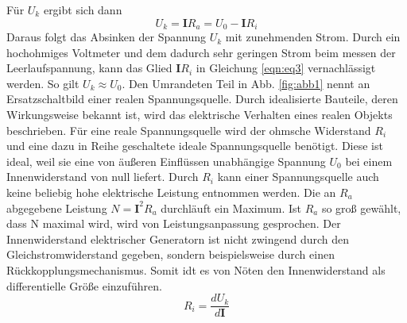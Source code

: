 Für $U_k$ ergibt sich dann
\begin{equation}
  U_k = \symbf{I} R_a = U_0 - \symbf{I} R_i
  \label{eqn:eq3}
\end{equation}
Daraus folgt das Absinken der Spannung $U_k$ mit zunehmenden Strom.
Durch ein hochohmiges Voltmeter und dem dadurch sehr geringen Strom beim messen der Leerlaufspannung, kann das Glied $\symbf{I} R_i$ in Gleichung \ref{eqn:eq3} vernachlässigt werden.
So gilt $U_k \approx U_0$.
Den Umrandeten Teil in Abb. \ref{fig:abb1} nennt an Ersatzschaltbild einer realen Spannungsquelle.
Durch idealisierte Bauteile, deren Wirkungsweise bekannt ist, wird das elektrische Verhalten eines realen Objekts beschrieben.
Für eine reale Spannungsquelle wird der ohmsche Widerstand $R_i$ und eine dazu in Reihe geschaltete ideale Spannungsquelle benötigt.
Diese ist ideal, weil sie eine von äußeren Einflüssen unabhängige Spannung $U_0$ bei einem Innenwiderstand von null liefert.
Durch $R_i$ kann einer Spannungsquelle auch keine beliebig hohe elektrische Leistung entnommen werden.
Die an $R_a$ abgegebene Leistung $N = \symbf{I}^2 R_a$ durchläuft ein Maximum.
Ist $R_a$ so groß gewählt, dass N maximal wird, wird von Leistungsanpassung gesprochen.
Der Innenwiderstand elektrischer Generatorn ist nicht zwingend durch den Gleichstromwiderstand gegeben, sondern beispielsweise durch einen Rückkopplungsmechanismus.
Somit idt es von Nöten den Innenwiderstand als differentielle Größe einzuführen.
\begin{equation}
  R_i = \frac{dU_k}{d\symbf{I}}
  \label{eqn:eq4}
\end{equation}